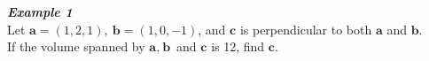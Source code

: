 \documentclass[12px]{article}
\begin{document}
\begin{enumerate}
\begin{enumerate}[(1)]
    \end{enumerate}
\end{enumerate}
\newpage
\noindent\textit{\textbf{Example 1}}\\
Let $\textbf{a}=(1,2,1),\ \textbf{b}=(1,0,-1)$, and $\textbf{c}$ is perpendicular to both $\textbf{a}$ and $\textbf{b}$.\\If the volume spanned by $\textbf{a},\ \textbf{b}$ and $\textbf{c}$ is 12, find $\textbf{c}$.\\
\\
\end{document}
